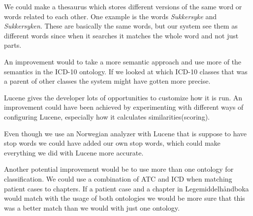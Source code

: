 We could make a thesaurus which stores different versions of the same word or
words related to each other. One example is the words \emph{Sukkersyke} and
\emph{Sukkersyken}. These are basically the same words, but our system see them
as different words since when it searches it matches the whole word and not just
parts.

An improvement would to take a more semantic approach and use more of the
semantics in the ICD-10 ontology. If we looked at which ICD-10 classes that was
a parent of other classes the system might have gotten more precise.

Lucene gives the developer lots of opportunities to customize how it is run. An
improvement could have been achieved by experimenting with different ways of
configuring Lucene, especially how it calculates similarities(scoring).

Even though we use an Norwegian analyzer with Lucene that is suppose to have
stop words we could have added our own stop words, which could make everything we
did with Lucene more accurate.

Another potential improvement would be to use more than one ontology for
classification. We could use a combination of ATC and ICD when matching patient
cases to chapters. If a patient case and a chapter in Legemiddelhåndboka would
match with the usage of both ontologies we would be more sure that this was a
better match than we would with just one ontology.


